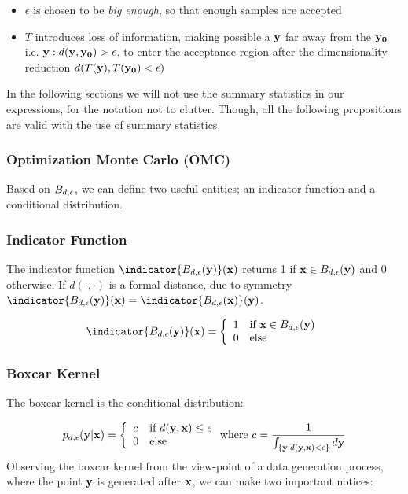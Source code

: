 \begin{itemize}
\item $\epsilon$ is chosen to be \textit{big enough}, so that enough
  samples are accepted
\item $T$ introduces loss of information, making possible a $\mathbf{y}$ far
  away from the $\mathbf{y_0}$ i.e. $\mathbf{y}: d(\mathbf{y},\mathbf{y_0})>\epsilon$, to enter
  the acceptance region after the dimensionality reduction
  $d(T(\mathbf{y}), T(\mathbf{y_0}) < \epsilon)$
\end{itemize}

\noindent
In the following sections we will not use the summary statistics in
our expressions, for the notation not to clutter. Though, all the
following propositions are valid with the use of summary statistics.
  
\subsubsection{Optimization Monte Carlo (OMC)}

Based on $B_{d,\epsilon}$, we can define two useful entities; an indicator
function and a conditional distribution.

\subsubsection*{Indicator Function}

The indicator function $\indicator{\region(\yb)}(\xb)$ returns 1 if
$\mathbf{x} \in B_{d,\epsilon}(\mathbf{y})$ and 0 otherwise. If $d(\cdot,\cdot)$ is a
formal distance, due to symmetry
$\indicator{\region(\yb)}(\xb) = \indicator{\region(\xb)}(\yb)$.

\begin{gather} \label{eq:indicator} \indicator{\region(\yb)}(\xb)=
  \left\{
    \begin{array}{ll}
      1 & \mbox{if } \xb \in \region(\yb) \\
      0 & \mbox{else } 
    \end{array} \right. \end{gather}

\subsubsection*{Boxcar Kernel}

The boxcar kernel is the conditional distribution:

\begin{gather}\label{eq:boxcar_kernel}
  p_{d,\epsilon}(\mathbf{y}|\mathbf{x}) = \left\{
    \begin{array}{ll}
      c  & \mbox{if } d(\mathbf{y},\mathbf{x}) \leq \epsilon \\
      0 & \mbox{else } 
    \end{array}
  \right. \text{where } c = \frac{1}{\int_{ \{ \mathbf{y}: d(\mathbf{y},\mathbf{x}) <
      \epsilon \} } d\mathbf{y}}
\end{gather}
%
Observing the boxcar kernel from the view-point of a data generation
process, where the point $\mathbf{y}$ is generated after $\mathbf{x}$, we can make
two important notices:

